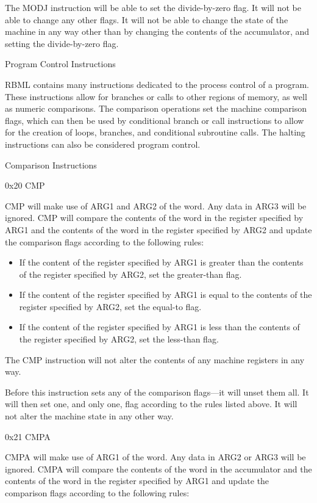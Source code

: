 \documentclass[]{article}
\providecommand{\tightlist}{%
  \setlength{\itemsep}{0pt}\setlength{\parskip}{0pt}}
\begin{document}
The MODJ instruction will be able to set the divide-by-zero flag. It
will not be able to change any other flags. It will not be able to
change the state of the machine in any way other than by changing the
contents of the accumulator, and setting the divide-by-zero flag.

Program Control Instructions

RBML contains many instructions dedicated to the process control of a
program. These instructions allow for branches or calls to other regions
of memory, as well as numeric comparisons. The comparison operations set
the machine comparison flags, which can then be used by conditional
branch or call instructions to allow for the creation of loops,
branches, and conditional subroutine calls. The halting instructions can
also be considered program control.

Comparison Instructions

0x20 CMP

CMP will make use of ARG1 and ARG2 of the word. Any data in ARG3 will be
ignored. CMP will compare the contents of the word in the register
specified by ARG1 and the contents of the word in the register specified
by ARG2 and update the comparison flags according to the following
rules:

\begin{itemize}
\tightlist
\item
  If the content of the register specified by ARG1 is greater than the
  contents of the register specified by ARG2, set the greater-than flag.
\item
  If the content of the register specified by ARG1 is equal to the
  contents of the register specified by ARG2, set the equal-to flag.
\item
  If the content of the register specified by ARG1 is less than the
  contents of the register specified by ARG2, set the less-than flag.
\end{itemize}

The CMP instruction will not alter the contents of any machine registers
in any way.

Before this instruction sets any of the comparison flags---it will unset
them all. It will then set one, and only one, flag according to the
rules listed above. It will not alter the machine state in any other
way.

0x21 CMPA

CMPA will make use of ARG1 of the word. Any data in ARG2 or ARG3 will be
ignored. CMPA will compare the contents of the word in the accumulator
and the contents of the word in the register specified by ARG1 and
update the comparison flags according to the following rules:
\end{document}
